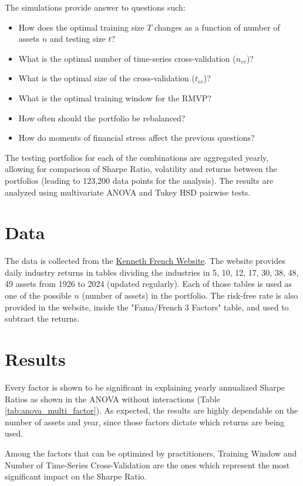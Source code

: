 \documentclass{article}
\begin{document}
The simulations provide answer to questions such:
\begin{itemize}
    \item How does the optimal training size $T$ changes as a function of number of assets $n$ and testing size $t$?
    \item What is the optimal number of time-series cross-validation ($n_{cv}$)?
    \item What is the optimal size of the cross-validation ($t_{cv}$)?
    \item What is the optimal training window for the RMVP?
    \item How often should the portfolio be rebalanced?
    \item How do moments of financial stress affect the previous questions?
\end{itemize}

The testing portfolios for each of the combinations are aggregated yearly, allowing for comparison of Sharpe Ratio, volatility and returns between the portfolios (leading to 123,200 data points for the analysis). The results are analyzed using multivariate ANOVA and Tukey HSD pairwise tests.

\FloatBarrier
\section{Data}
The data is collected from the \hyperlink{https://mba.tuck.dartmouth.edu/pages/faculty/ken.french/data_library.html}{Kenneth French Website}. The website provides daily industry returns in tables dividing the industries in 5, 10, 12, 17, 30, 38, 48, 49 assets from 1926 to 2024 (updated regularly). Each of those tables is used as one of the possible $n$ (number of assets) in the portfolio. The risk-free rate is also provided in the website, inside the "Fama/French 3 Factors" table, and used to subtract the returns.

\FloatBarrier
\section{Results}
Every factor is shown to be significant in explaining yearly annualized Sharpe Ratios as shown in the ANOVA without interactions (Table \ref{tab:anova_multi_factor}). As expected, the results are highly dependable on the number of assets and year, since those factors dictate which returns are being used.

Among the factors that can be optimized by practitioners, Training Window and Number of Time-Series Cross-Validation are the ones which represent the most significant impact on the Sharpe Ratio.
\end{document}
